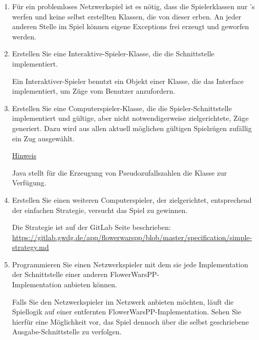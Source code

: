 \begin{enumerate}
\begin{enumerate}
\item Für ein problemloses Netzwerkspiel ist es nötig, dass die Spielerklassen nur 's werfen und keine selbst erstellten Klassen, die von dieser erben. An jeder anderen Stelle im Spiel können eigene Exceptions frei erzeugt und geworfen werden.



\item Erstellen Sie eine Interaktive-Spieler-Klasse, die die Schnittstelle \\  implementiert.

Ein Interaktiver-Spieler benutzt ein Objekt einer Klasse, die das Interface \\  implementiert, um Züge vom Benutzer anzufordern.

\item Erstellen Sie eine Computerspieler-Klasse, die die Spieler-Schnittstelle implementiert und gültige, aber nicht notwendigerweise zielgerichtete, Züge generiert. Dazu wird aus allen aktuell möglichen gültigen Spielzügen zufällig ein Zug ausgewählt.

\underline{Hinweis}

Java stellt für die Erzeugung von Pseudozufallszahlen die Klasse  zur Verfügung.

\item Erstellen Sie einen weiteren Computerspieler, der zielgerichtet, entsprechend der einfachen Strategie, versucht das Spiel zu gewinnen.

Die Strategie ist auf der GitLab Seite beschrieben: \\
\href{https://gitlab.gwdg.de/app/flowerwarspp/blob/master/specification/simple-strategy.md}{https://gitlab.gwdg.de/app/flowerwarspp/blob/master/specification/simple-strategy.md}

\item Programmieren Sie einen Netzwerkspieler mit dem sie jede Implementation der Schnittstelle  einer anderen FlowerWarsPP- \\Implementation anbieten können.

Falls Sie den Netzwerkspieler im Netzwerk anbieten möchten, läuft die Spiellogik auf einer entfernten FlowerWarsPP-Implementation. Sehen Sie hierfür eine Möglichkeit vor, das Spiel dennoch über die selbst geschriebene Ausgabe-Schnittstelle zu verfolgen.


\end{enumerate}
\end{enumerate}
